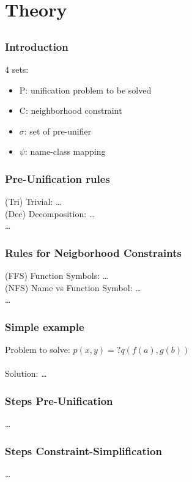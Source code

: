 \section{Theory} \subsection{}

	\begin{frame}[fragile=singleslide]
	\frametitle{Introduction}
		4 sets:
		\begin{itemize}
			\item P: unification problem to be solved
			\item C: neighborhood constraint
			\item $\sigma$: set of pre-unifier
			\item $\psi$: name-class mapping
		\end{itemize}
  \end{frame}	
		
		
	\begin{frame}[fragile=singleslide]
	\frametitle{Pre-Unification rules}
		(Tri) Trivial: \ldots \\
		(Dec) Decomposition: \ldots \\
		\ldots
	
  \end{frame}	
		
		
		\begin{frame}[fragile=singleslide]
	\frametitle{Rules for Neigborhood Constraints}
		(FFS) Function Symbols: \ldots \\
		(NFS) Name vs Function Symbol: \ldots \\
		\ldots
	
  \end{frame}	
	
		
		\begin{frame}[fragile=singleslide]
	\frametitle{Simple example}
		Problem to solve: $p(x,y) =? q(f(a),g(b))$\\
		\\
		Solution: \ldots
	
  \end{frame}	
	

		\begin{frame}[fragile=singleslide]
	\frametitle{Steps Pre-Unification}
		\ldots
	
  \end{frame}	
	

		\begin{frame}[fragile=singleslide]
	\frametitle{Steps Constraint-Simplification}
		\ldots
	
  \end{frame}	
	
	